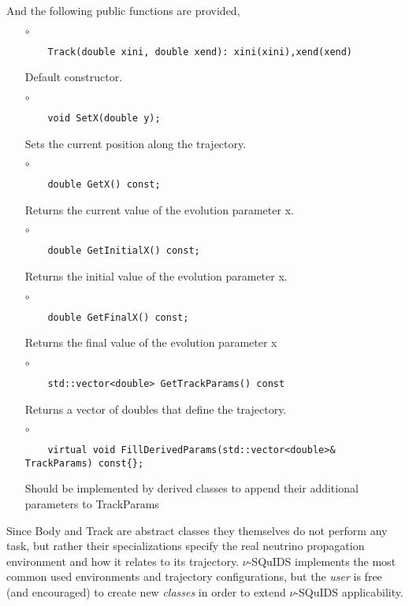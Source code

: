 %
And the following public functions are provided,
%
\begin{itemize}
\item[$\circ$]  
  \begin{lstlisting}
    Track(double xini, double xend): xini(xini),xend(xend)
  \end{lstlisting}
  Default constructor.
\item[$\circ$]  
  \begin{lstlisting}
    void SetX(double y);
  \end{lstlisting}
  Sets the current position along the trajectory.
  
\item[$\circ$]  
  \begin{lstlisting}
    double GetX() const;
  \end{lstlisting}
  Returns the current value of the evolution parameter {\ttf x}.
\item[$\circ$]  
  \begin{lstlisting}
    double GetInitialX() const;
  \end{lstlisting}    
  Returns the initial value of the evolution parameter {\ttf x}.
\item[$\circ$]  
  \begin{lstlisting}
    double GetFinalX() const;
  \end{lstlisting}          
  Returns the final value of the evolution parameter {\ttf x}
\item[$\circ$]  
  \begin{lstlisting}
    std::vector<double> GetTrackParams() const 
  \end{lstlisting}           
  Returns a vector of doubles that define the trajectory.
\item[$\circ$]  
  \begin{lstlisting}
    virtual void FillDerivedParams(std::vector<double>& TrackParams) const{};
  \end{lstlisting}           
  Should be implemented by derived classes to append their
  additional parameters to TrackParams
\end{itemize}


Since {\ttf Body} and {\ttf Track} are abstract classes they themselves do not perform any task, but rather their specializations specify the real neutrino propagation environment and how it relates to its trajectory. $\nu$-SQuIDS implements the most common used environments and trajectory configurations, but the {\it user} is free (and encouraged) to create new {\it classes} in order to extend $\nu$-SQuIDS applicability.

